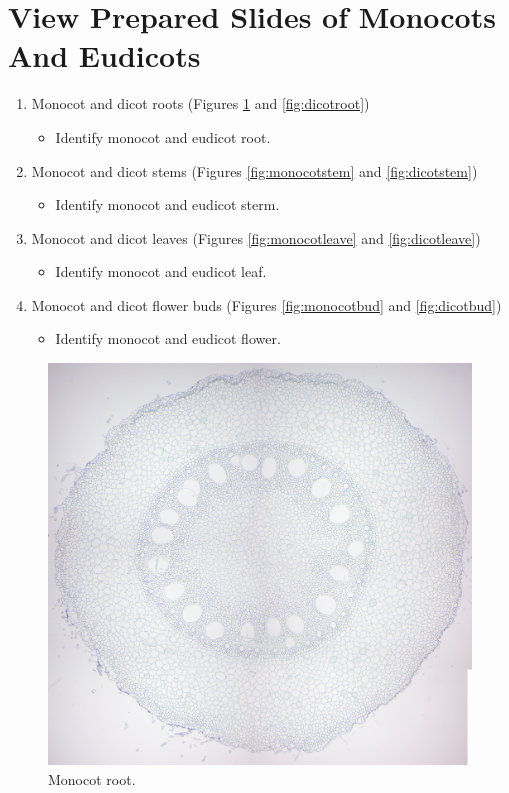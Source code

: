 \section{View Prepared Slides of Monocots And
Eudicots}\label{view-prepared-slides-of-monocots-and-eudicots}

\begin{enumerate}
\def\labelenumi{\arabic{enumi}.}
\tightlist
\item
  Monocot and dicot roots (Figures \ref{fig:monocotroot} and
  \ref{fig:dicotroot})

  \begin{itemize}
  \tightlist
  \item
    Identify monocot and eudicot root.
  \end{itemize}
\item
  Monocot and dicot stems (Figures \ref{fig:monocotstem} and
  \ref{fig:dicotstem})

  \begin{itemize}
  \tightlist
  \item
    Identify monocot and eudicot sterm.
  \end{itemize}
\item
  Monocot and dicot leaves (Figures \ref{fig:monocotleave} and
  \ref{fig:dicotleave})

  \begin{itemize}
  \tightlist
  \item
    Identify monocot and eudicot leaf.
  \end{itemize}
\item
  Monocot and dicot flower buds (Figures \ref{fig:monocotbud} and
  \ref{fig:dicotbud})

  \begin{itemize}
  \tightlist
  \item
    Identify monocot and eudicot flower.
  \end{itemize}
\end{enumerate}

\begin{figure}

{\centering \includegraphics[width=0.7\linewidth]{./figures/gymnosperms/monocot_root}

}

\caption{Monocot root.}\label{fig:monocotroot}
\end{figure}

